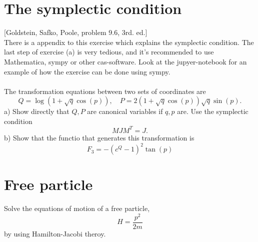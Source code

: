 \documentclass{article}
\begin{document}
    \section{The symplectic condition}
        [Goldstein, Safko, Poole, problem 9.6, 3rd. ed.] \\
        There is a appendix to this exercise which explains the symplectic condition. The last step of exercise (a) is very tedious, and it's recommended to use Mathematica, sympy or other cas-software. Look at the jupyer-notebook for an example of how the exercise can be done using sympy. \\ \\
        The transformation equations between two sets of coordinates are
        \begin{equation*}
            Q = \log\left(1 + \sqrt{q} \cos(p)\right), \quad P = 2\left(1 + \sqrt{q}\cos(p)\right)\sqrt{q}\sin(p).
        \end{equation*}
        a) Show directly that $Q, P$ are canonical variables if $q, p$ are. Use the symplectic condition 
        \begin{equation*}
            M J M^T = J.
        \end{equation*}
        b) Show that the functio that generates this transformation is 
        \begin{equation*}
            F_3 = -(c^Q - 1)^2 \tan(p)
        \end{equation*}

    \section{Free particle}
        Solve the equations of motion of a free particle, 
        \begin{equation*}
            H = \frac{p^2}{2m}
        \end{equation*}
        by using Hamilton-Jacobi theroy.
\end{document}
